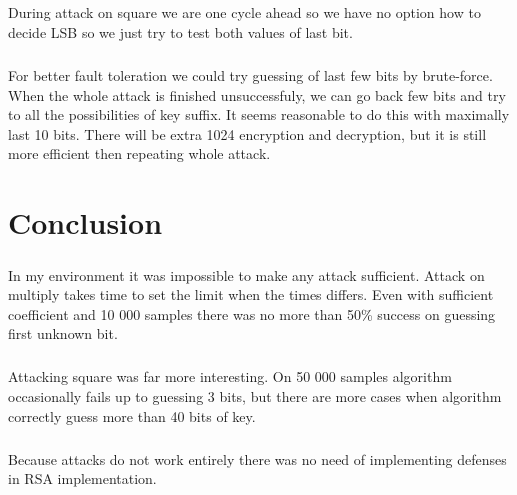 \documentclass[thesis=B,english]{FITthesis}[2012/10/20]
\begin{document}
\paragraph*{}{
During attack on square we are one cycle ahead so we have no option how to decide LSB so we just try to test both values of last bit.
}

\paragraph*{}
{For better fault toleration we could try guessing of last few bits by brute-force. When the whole attack is finished unsuccessfuly, we can go back few bits and try to all the possibilities of key suffix. It seems reasonable to do this with maximally last 10 bits. There will be extra 1024 encryption and decryption, but it is still more efficient then repeating whole attack.
}

\chapter{Conclusion}

\paragraph*{}{
In my environment it was impossible to make any attack sufficient. Attack on multiply takes time to set the limit when the times differs. Even with sufficient coefficient and 
10 000 samples there was no more than 50\% success on guessing first unknown bit.}

\paragraph{}{
Attacking square was far more interesting. On 50 000 samples algorithm occasionally fails up to guessing 3 bits, but there are more cases when algorithm correctly guess more than 40 bits of key.		
}




\paragraph*{}{
Because attacks do not work entirely there was no need of implementing defenses in RSA implementation.
}


\end{document}
